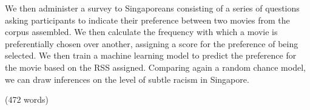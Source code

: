\documentclass[%
 reprint,
 amsmath,amssymb,
 aps,
]{revtex4-2}
\begin{document}
We then administer a survey to Singaporeans consisting of a series of questions asking participants to indicate their preference between two movies from the corpus assembled. We then calculate the frequency with which a movie is preferentially chosen over another, assigning a score for the preference of being selected. We then train a machine learning model to predict the preference for the movie based on the RSS assigned. Comparing again a random chance model, we can draw inferences on the level of subtle racism in Singapore.

\hfill (472 words)


\end{document}
